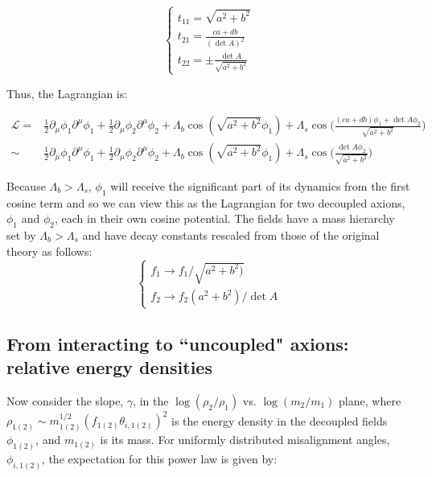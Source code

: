 \documentclass[11pt]{article}
\begin{document}
\begin{equation}
    \begin{cases}
        t_{11} = \sqrt{a^2+b^2} \\
        t_{21} = \frac{ca+db}{(\det{A})^2} \\
        t_{22} = \pm \frac{\det{A}}{\sqrt{a^2+b^2}}
    \end{cases}
\end{equation}

Thus, the Lagrangian is:

\begin{align*}
   \mathcal{L} = &  \frac{1}{2}\partial_\mu\phi_1\partial^\mu\phi_1+\frac{1}{2}\partial_\mu\phi_2\partial^\mu\phi_2+\Lambda_b\cos{(\sqrt{a^2+b^2}\phi_1)}+\Lambda_s\cos{\bigg(\frac{(ca+db)\phi_1+\det{A}\phi_2}{\sqrt{a^2+b^2}}\bigg)} \\
   \sim & \frac{1}{2}\partial_\mu\phi_1\partial^\mu\phi_1+\frac{1}{2}\partial_\mu\phi_2\partial^\mu\phi_2+\Lambda_b\cos{(\sqrt{a^2+b^2}\phi_1)}+\Lambda_s\cos{\bigg(\frac{\det{A}\phi_2}{\sqrt{a^2+b^2}}\bigg)}
\end{align*}

Because $\Lambda_b>\Lambda_s$, $\phi_1$ will receive the significant part of its dynamics from the first cosine term and so we can view this as the Lagrangian for two decoupled axions, $\phi_1$ and $\phi_2$, each in their own cosine potential. The fields have a mass hierarchy set by $\Lambda_b>\Lambda_s$ and have decay constants rescaled from those of the original theory as follows:
\begin{equation}
    \label{eq:decay-consts-GS}
    \begin{cases}
        f_1 \rightarrow f_1/\sqrt{a^2+b^2)} \\
        f_2 \rightarrow f_2(a^2+b^2)/\det{A}
    \end{cases}
\end{equation}

\subsection{From interacting to ``uncoupled" axions: relative energy densities}
\label{subsec:GS-powerlaw}
Now consider the slope, $\gamma$, in the $\log{(\rho_2/\rho_1)}$ vs. $\log{(m_2/m_1)}$ plane, where $\rho_{1(2)}\sim m_{1(2)}^{1/2}(f_{1(2)}\theta_{i,1(2)})^2$ is the energy density in the decoupled fields $\phi_{1(2)}$, and $m_{1(2)}$ is its mass. For uniformly distributed misalignment angles, $\phi_{i,1(2)}$, the expectation for this power law is given by:
\end{document}
